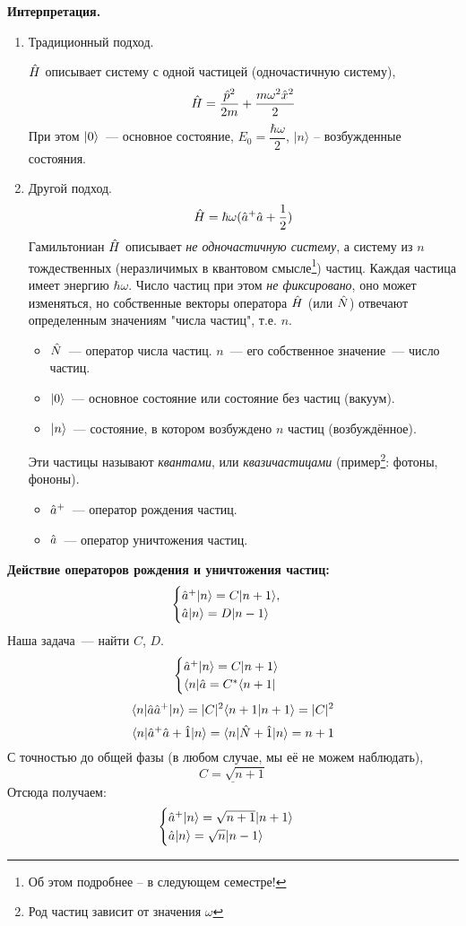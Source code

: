 \textbf{Интерпретация.}
\begin{enumerate}
  \item Традиционный подход.

  $\Hat H$ описывает систему с одной частицей (одночастичную систему),
  $$
    \Hat H = \dfrac{\Hat p^2}{2m} + \dfrac{m \omega^2 \Hat x^2}{2}
  $$
  При этом $| 0 \rangle$~--- основное состояние, $E_0 = \dfrac{\hbar \omega}{2}$, $|n\rangle$ -- возбужденные состояния.
  \item Другой подход.
  $$
    \Hat H = \hbar \omega (\Hat a^+ \Hat a + \dfrac12)
  $$
Гамильтониан  ${\Hat H}$ описывает \emph{не одночастичную систему}, а систему из $n$ тождественных (неразличимых в квантовом смысле\footnote{Об этом подробнее -- в следующем семестре!}) частиц. Каждая частица имеет энергию $\hbar\omega$. Число частиц при этом \emph{не фиксировано}, оно может изменяться, но собственные векторы оператора ${\Hat H}$ (или ${\Hat N}$) отвечают определенным значениям "числа частиц"{}, т.е. $n$.

  \begin{itemize}
    \item $\Hat N$~--- оператор числа частиц. $n$~--- его собственное значение~--- число частиц.
    \item $| 0 \rangle$~--- основное состояние или состояние без частиц (вакуум).
    \item $| n \rangle$~--- состояние, в котором возбуждено $n$ частиц (возбуждённое).
  \end{itemize}
  Эти частицы называют \emph{квантами}, или \emph{квазичастицами} (пример\footnote{Род частиц зависит от значения $\omega$}: фотоны, фононы).
  \begin{itemize}
    \item $\Hat a^+$~--- оператор рождения частиц.
    \item $\Hat a$~--- оператор уничтожения частиц.
  \end{itemize}
\end{enumerate}
\textbf{Действие операторов рождения и уничтожения частиц:}
$$
    \begin{cases}
        \Hat a^+ | n \rangle = C | n+1 \rangle,\\
        \Hat a | n \rangle = D | n-1 \rangle
    \end{cases}
$$
Наша задача~--- найти $C$, $D$.
$$
    \begin{cases}
        \Hat a^+ | n \rangle = C | n+1 \rangle\\
        \langle n | \Hat a = C^\ast \langle n+1 |
    \end{cases}
$$
$$
    { \langle n |\Hat a \Hat a^+| n \rangle } = |C|^2 \langle n+1 | n+1 \rangle = |C|^2
$$
$$
    { \langle n |\hat a^+ \hat a + \hat 1| n \rangle } = { \langle n |\Hat N + \hat 1| n \rangle } = n+1
$$
С точностью до общей фазы (в любом случае, мы её не можем наблюдать),
$$
\underline{    C = \sqrt{n+1}}
$$
Отсюда получаем:
$$
    \begin{cases}
        \hat a^+ | n \rangle = \sqrt{n+1} | n+1 \rangle\\
        \hat a | n \rangle = \sqrt{n} | n-1 \rangle
    \end{cases}
$$

